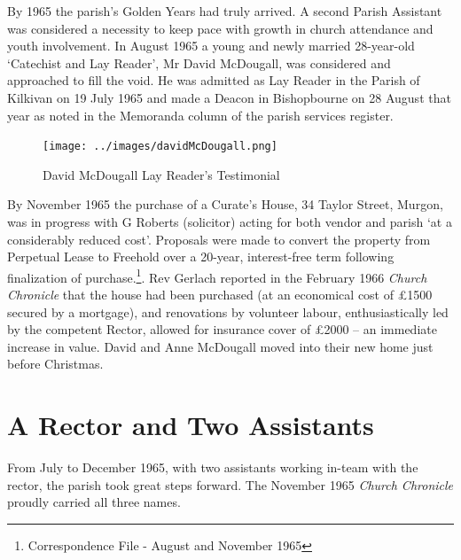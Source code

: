 By 1965 the parish's Golden Years had truly arrived. A second Parish Assistant was considered a necessity to keep pace with growth in church attendance and youth involvement. In August 1965 a young and newly married 28-year-old `Catechist and Lay Reader', Mr David McDougall, was considered and approached to fill the void. He was admitted as Lay Reader in the Parish of Kilkivan on 19 July 1965 and made a Deacon in Bishopbourne on 28 August that year as noted in the Memoranda column of the parish services register.









\begin{figure}[!htb]
\begin{center}
\texttt{[image: ../images/davidMcDougall.png]}
\caption{David McDougall Lay Reader's Testimonial}
\end{center}
\end{figure}




By November 1965 the purchase of a Curate's House, 34 Taylor Street, Murgon, was in progress with G Roberts (solicitor) acting for both vendor and parish `at a considerably reduced cost'. Proposals were made to convert the property from Perpetual Lease to Freehold over a 20-year, interest-free term following finalization of purchase.\footnote{Correspondence File - August and November 1965}. Rev Gerlach reported in the February 1966 \emph{Church Chronicle} that the house had been purchased (at an economical cost of \pounds1500 secured by a mortgage), and renovations by volunteer labour, enthusiastically led by the competent Rector, allowed for insurance cover of \pounds2000 -- an immediate increase in value. David and Anne McDougall moved into their new home just before Christmas.


\section{A Rector and Two Assistants}



From July to December 1965, with two assistants working in-team with the rector, the parish took great steps forward. The November 1965 \emph{Church Chronicle} proudly carried all three names.



